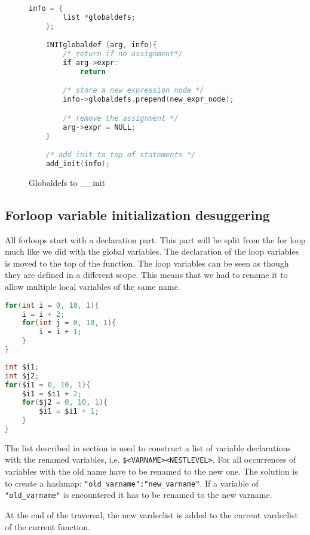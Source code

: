 \documentclass[a4paper]{article}
\begin{document}
\begin{figure}[h]
    \begin{lstlisting}[language=C, frame=single]
    info = {
        list *globaldefs;
    };

    INITglobaldef (arg, info){
        /* return if no assignment*/
        if arg->expr:
            return

        /* store a new expression node */
        info->globaldefs.prepend(new_expr_node);

        /* remove the assignment */
        arg->expr = NULL;
    }

    /* add init to top of statements */
    add_init(info);
    \end{lstlisting}
    \caption{Globaldefs to \_\_init}
    \label{fig:init}
\end{figure}

\subsection{Forloop variable initialization desuggering}
All forloops start with a declaration part. This part will be split from the
for loop much like we did with the global variables. The declaration of the
loop variables is moved to the top of the function. The loop variables can be
seen as though they are defined in a different scope. This means that we had to
rename it to allow multiple local variables of the same name.

\begin{lstlisting}[language=C]
for(int i = 0, 10, 1){
    i = i + 2;
    for(int j = 0, 10, 1){
        i = i + 1;
    }
}
\end{lstlisting}
\begin{lstlisting}[language=C]
int $i1;
int $j2;
for($i1 = 0, 10, 1){
    $i1 = $i1 + 2;
    for($j2 = 0, 10, 1){
        $i1 = $i1 + 1;
    }
}
\end{lstlisting}

The list described in section %
is used to construct a list of variable declarations with the renamed
variables, i.e. \texttt{\$<VARNAME><NESTLEVEL>}. For all occurrences of variables with
the old name have to be renamed to the new one. The solution is to create a
hashmap: \texttt{"old\_varname":"new\_varname"}. If a variable of
\texttt{"old\_varname"} is encountered it has to be renamed to the new varname.

At the end of the traversal, the new vardeclist is added to the current
vardeclist of the current function.
\end{document}
